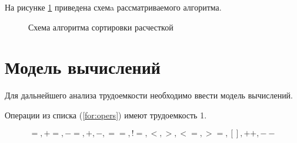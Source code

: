 На рисунке \ref{fig:coctail_sort} приведена схемa рассматриваемого алгоритма.
\FloatBarrier
\begin{figure}[h]
	\caption{Схема алгоритма сортировки расчесткой}
	\label{fig:coctail_sort}
\end{figure}
\FloatBarrier
\clearpage

\section{Модель вычислений}
Для дальнейшего анализа трудоемкости необходимо ввести модель вычислений.

Операции из списка (\ref{for:opers}) имеют трудоемкость 1.

\begin{equation}
	\label{for:opers}
	=, +=, -=, +, -, ==, !=, <, >, <=, >=, [], ++, {-}-
\end{equation}


